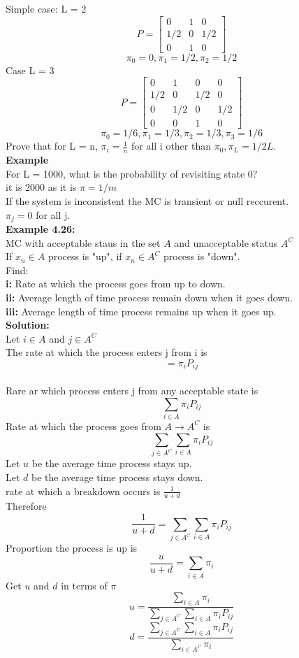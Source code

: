 \documentclass{article}
\begin{document}
Simple case: L = 2\\
$$ P = \begin{bmatrix}
    0 & 1 & 0 \\
    1/2 & 0 & 1/2 \\
    0 & 1 & 0
\end{bmatrix}
$$
$$\pi_0 = 0, \pi_1 = 1/2, \pi_2 = 1/2$$
Case L = 3\\
$$ P = \begin{bmatrix}
    0 & 1 & 0 & 0 \\
    1/2 & 0 & 1/2 & 0 \\
    0 & 1/2 & 0 & 1/2 \\
    0 & 0 & 1 & 0
\end{bmatrix}$$
$$\pi_0 = 1/6 , \pi_1 = 1/3 , \pi_2 = 1/3 , \pi_3 = 1/6$$
Prove that for L = n, $\pi_i = \frac{1}{n}$ for all i other than $\pi_0, \pi_L = 1/2L$.\\
\textbf{Example}\\
For L = 1000, what is the probability of revisiting state 0?\\
it is 2000 as it is $\pi = 1/m$\\
If the system is inconsistent the MC is transient or null reccurent.\\
$\pi_j = 0 $ for all j.\\
\textbf{Example 4.26:}\\
MC with acceptable staus in the set $A$ and unacceptable status $A^C$\\
If $x_n \in A$ process is "up", if $x_n \in A^C$ process is "down".\\
Find: \\
\textbf{i:} Rate at which the process goes from up to down.\\
\textbf{ii:} Average length of time process remain down when it goes down.\\
\textbf{iii:} Average length of time process remains up when it goes up.\\
\textbf{Solution:}\\
Let $i \in A$ and $j \in A^C$\\
The rate at which the process enters j from i is $$= \pi_i P_{ij}$$\\
Rare ar which process enters j from any acceptable state is $$\sum_{i \in A} \pi_i P_{ij}$$
Rate at which the process goes from $A \rightarrow A^C$ is $$\sum_{j \in A^C} \sum_{i \in A} \pi_i P_{ij}$$
Let $u$ be the average time process stays up.\\
Let $d$ be the average time process stays down.\\
rate at which a breakdown occurs is $\frac{1}{u+d}$\\
Therefore $$\frac{1}{u+d} = \sum_{j \in A^C} \sum_{i \in A} \pi_i P_{ij}$$
Proportion the process is up is 
$$\frac{u}{u+d} = \sum_{i \in A} \pi_i$$
Get $u$ and $d$ in terms of $\pi$\\
$$u = \frac{\sum_{i \in A} \pi_i}{\sum_{j \in A^C} \sum_{i \in A} \pi_i P_{ij}}$$
$$d = \frac{\sum_{j \in A^C} \sum_{i \in A} \pi_i P_{ij}}{\sum_{i \in A^C} \pi_i}$$
\end{document}
